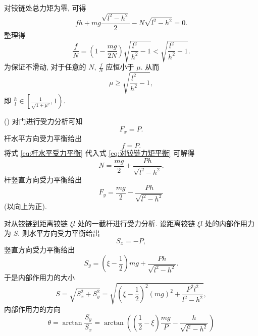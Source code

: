 \documentclass{article}
\newcounter{para}
\newcommand\mypara{\par\refstepcounter{para}(\thepara)\space}
\begin{document}
\begin{figure}[h!]
	\centering
	\caption{}
	\label{fig:杆受力分析}
\end{figure}

对铰链处总力矩为零, 可得
\begin{equation}
	fh+mg\frac{\sqrt{l^2-h^2}}2-N\sqrt{l^2-h^2}=0.
	\label{eq:对铰链力矩平衡}
\end{equation}
整理得
\begin{equation}
	\frac fN=\left(1-\frac{mg}{2N}\right)\sqrt{\frac{l^2}{h^2}-1}<\sqrt{\frac{l^2}{h^2}-1}.
\end{equation}
为保证不滑动, 对于任意的 $N$, $\frac fN$ 应恒小于 $\mu$.
从而
\begin{equation}
	\mu\ge\sqrt{\frac{l^2}{h^2}-1},
\end{equation}
即 $\frac hl\in\left[\frac1{\sqrt{1+\mu^2}},1\right)$.

\mypara
对门进行受力分析可知
\begin{equation}
	F_x=P.
\end{equation}
杆水平方向受力平衡给出
\begin{equation}
	f=P.
	\label{eq:杆水平受力平衡}
\end{equation}
将式 \ref{eq:杆水平受力平衡} 代入式 \ref{eq:对铰链力矩平衡} 可解得
\begin{equation}
	N=\frac{mg}2+\frac{Ph}{\sqrt{l^2-h^2}}.
\end{equation}
杆竖直方向受力平衡给出
\begin{equation}
	F_y=\frac{mg}2-\frac{Ph}{\sqrt{l^2-h^2}}
\end{equation}
(以向上为正).

对从铰链到距离铰链 $\xi l$ 处的一截杆进行受力分析.
设距离铰链 $\xi l$ 处的内部作用力为 $S$.
则水平方向受力平衡给出
\begin{equation}
	S_x=-P,
\end{equation}
竖直方向受力平衡给出
\begin{equation}
	S_y=\left(\xi-\frac12\right)mg+\frac{Ph}{\sqrt{l^2-h^2}}.
\end{equation}
于是内部作用力的大小
\begin{equation}
	S=\sqrt{S_x^2+S_y^2}=\sqrt{\left(\xi-\frac12\right)^2\left(mg\right)^2+\frac{P^2l^2}{l^2-h^2}},
\end{equation}
内部作用力的方向
\begin{equation}
	\theta=\arctan\frac{S_y}{S_x}=
	\arctan\!\left(\left(\frac12-\xi\right)\frac{mg}P-\frac h{\sqrt{l^2-h^2}}\right)
\end{equation}
\end{document}
